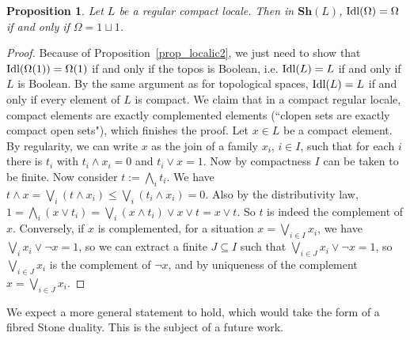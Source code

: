 \documentclass{article}
\newtheorem{proposition}[theorem]{Proposition}
\begin{document}
\begin{proposition}
    Let $L$ be a regular compact locale. Then in $\mathbf{Sh}(L)$, $\textup{Idl}(\Omega)=\Omega$ if and only if $\Omega=1\sqcup 1$. 
\end{proposition}
\begin{proof}
    Because of Proposition~\ref{prop_localic2}, we just need to show that $\textup{Idl}(\Omega(1))=\Omega(1)$ if and only if the topos is Boolean, i.e. $\textup{Idl}(L)=L$ if and only if $L$ is Boolean. By the same argument as for topological spaces, $\textup{Idl}(L)=L$ if and only if every element of $L$ is compact. We claim that in a compact regular locale, compact elements are exactly complemented elements (``clopen sets are exactly compact open sets"), which finishes the proof. Let $x\in L$ be a compact element. By regularity, we can write $x$ as the join of a family $x_i$, $i\in I$, such that for each $i$ there is $t_i$ with $t_i\land x_i=0$ and $t_i\lor x=1$. Now by compactness $I$ can be taken to be finite. Now consider $t:=\bigwedge_i t_i$. We have $t\land x=\bigvee_i(t\land x_i)\leq\bigvee_i(t_i\land x_i)=0$. Also by the distributivity law, $1=\bigwedge_i(x\lor t_i)=\bigvee_i(x\land t_i)\lor x\lor t= x\lor t$. So $t$ is indeed the complement of $x$. Conversely, if $x$ is complemented, for a situation $x=\bigvee_{i\in I} x_i$, we have $\bigvee_i x_i\lor \neg x=1$, so we can extract a finite $J\subseteq I$ such that $\bigvee_{i\in J} x_i\lor \neg x=1$, so $\bigvee_{i\in J} x_i$ is the complement of $\neg x$, and by uniqueness of the complement $x=\bigvee_{i\in J} x_i$. 
\end{proof}

We expect a more general statement to hold, which would take the form of a fibred Stone duality. This is the subject of a future work.
\end{document}
